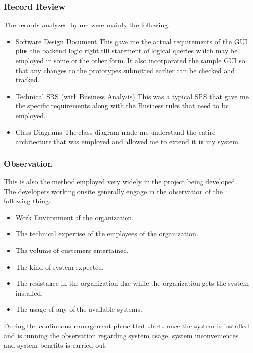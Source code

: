 \subsubsection{Record Review}

The records analyzed by me  were mainly the following:
\begin{itemize}
\item Software Design Document
This gave me the actual requirements of the GUI plus the backend logic right till statement of logical queries which may be employed in some or the other form. It also incorporated the sample GUI so that any  changes to the prototypes submitted earlier can be  checked and tracked.
\item Technical SRS (with Business Analysis)
This was a typical  SRS  that gave me the specific requirements along with the Business rules that need to be employed.
\item Class Diagrams
The class diagram made me understand the entire architecture that was employed and allowed me to extend it in my system.
\end{itemize}
\subsubsection{Observation}
This is also the method employed very widely in the project being developed. The  developers working   onsite generally engage in the observation of the following things:
\begin{itemize}
\item Work Environment of the organization.
\item The technical expertise of the employees of the organization.
\item The volume of customers entertained.
\item The kind of system expected.
\item The  resistance  in  the  organization  due   while   the   organization  gets   the system installed.
\item The usage of any of the available systems.
\end{itemize}
During the continuous management phase that starts once the system is installed and is running the   observation regarding system usage, system inconveniences and system benefits is carried  out.


